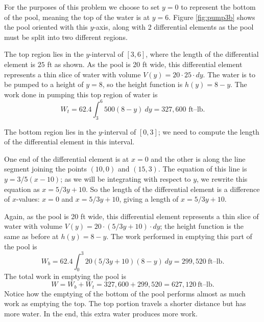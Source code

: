 {For the purposes of this problem we choose to set $y=0$ to represent the bottom of the pool, meaning the top of the water is at $y=6$. 
Figure \ref{fig:pump3b} shows the pool oriented with this $y$-axis, along with 2 differential elements as the pool must be split into two different regions. 

The top region lies in the $y$-interval of $[3,6]$, where the length of the differential element is $25$ ft as shown. As the pool is 20 ft wide, this differential element represents a thin slice of water with volume $V(y) = 20\cdot25\cdot dy$.  The water is to be pumped to a height of $y=8$, so the height function is $h(y) = 8-y$. The work done in pumping this top region of water is 
\[
W_t = 62.4\int_3^6 500(8-y)\ dy = 327,600 \text{ ft--lb}.
\]

The bottom region lies in the $y$-interval of $[0,3]$; we need to compute the length of the differential element in this interval.

One end of the differential element is at $x=0$ and the other is along the line segment joining the points $(10,0)$ and $(15,3)$. The equation of this line is $y= 3/5(x-10)$; as we will be integrating with respect to $y$, we rewrite this equation as $x=5/3y+10$. So the length of the differential element is a difference of $x$-values: $x=0$ and $x=5/3y+10$, giving a length of $x=5/3y+10$. 

Again, as the pool is 20 ft wide, this differential element  represents a thin slice of water with volume $V(y) = 20\cdot(5/3y+10)\cdot dy$; the height function is the same as before at $h(y)=8-y$. The work performed in emptying this part of the pool is
\[
W_b = 62.4\int_0^3 20(5/3y+10)(8-y)\ dy = 299,520\ \text{ft--lb}.
\]
The total work in emptying the pool is 
\[
W = W_b+W_t = 327,600+299,520 = 627,120\ \text{ft--lb}.
\]		
Notice how the emptying of the bottom of the pool performs almost as much work as emptying the top. The top portion travels a shorter distance but has more water. In the end, this extra water produces more work.
}\\


